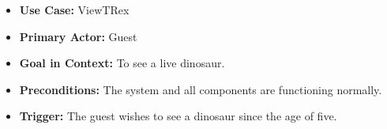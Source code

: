 \documentclass[12pt]{article}
\begin{document}
    \begin{itemize}
        \item[]\textbf{Use Case:}                                
            ViewTRex

        \item[]\textbf{Primary Actor:}
            Guest

        \item[]\textbf{Goal in Context:}
            To see a live dinosaur.

        \item[]\textbf{Preconditions:}
            The system and all components are functioning normally.
            
        \item[]\textbf{Trigger:}
            The guest wishes to see a dinosaur since the age of five.


\end{itemize}
\end{document}
